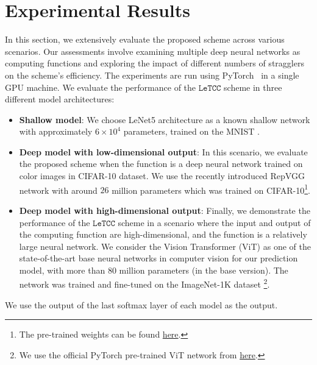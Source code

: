\documentclass{article}
\def\nprcc{\texttt{LeTCC}}
\begin{document}
\section{Experimental Results}\label{sec:exp_result}
In this section, we extensively evaluate the proposed scheme across various scenarios. Our assessments involve examining multiple deep neural networks as computing functions and exploring the impact of different numbers of stragglers on the scheme's efficiency. The experiments are run using PyTorch~\citep{paszke2019pytorch} in a single GPU machine. We evaluate the performance of the $\nprcc$ scheme in three different model architectures:
\begin{itemize}
    \item \textbf{Shallow model}: We choose LeNet5 \citep{lecun1998gradient} architecture as a known shallow network with approximately $6\times 10^4$ parameters, trained on the MNIST \citep{lecun2010mnist}.
    \item \textbf{Deep model with low-dimensional output}: In this scenario, we evaluate the proposed scheme when the function is a deep neural network trained on color images in CIFAR-10 \citep{krizhevsky2009learning} dataset. We use the recently introduced RepVGG \citep{ding2021repvgg} network with around $26$ million parameters which was trained on CIFAR-10\footnote{The pre-trained weights can be found  \href{https://github.com/chenyaofo/pytorch-cifar-models}{here}.}.
    \item \textbf{Deep model with high-dimensional output}: Finally, we demonstrate the performance of the $\nprcc$ scheme in a scenario where the input and output of the computing function are high-dimensional, and the function is a relatively large neural network. We consider the Vision Transformer (ViT) \citep{dosovitskiy2020image} as one of the state-of-the-art base neural networks in computer vision for our prediction model, with more than $80$ million parameters (in the base version). The network was trained and fine-tuned on the ImageNet-1K dataset \citep{deng2009imagenet}\footnote{We use the official PyTorch pre-trained ViT network from \href{https://pytorch.org/vision/main/models/generated/torchvision.models.vit_b_16.html}{here}.}.
\end{itemize}
 We use the output of the last softmax layer of each model as the output.
\setlength{\tabcolsep}{5pt}
\end{document}
